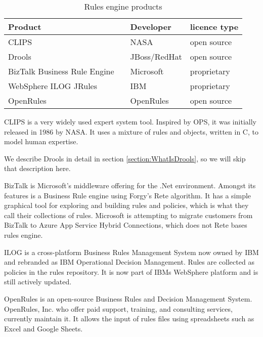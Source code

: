 \begin{table}[h]
    \begin{center}
        \begin{tabular}{ |l c |l|l| } 
            \hline
            Product                      &                             & Developer    & licence type   \\
            \hline
            CLIPS                        &\cite{CLIPSProductPage}      & NASA         & open source    \\ 
            Drools                       &\cite{DroolsProductPage}     & JBoss/RedHat & open source    \\ 
            BizTalk Business Rule Engine &\cite{BiztalkProductPage}    & Microsoft    & proprietary    \\ 
            WebSphere ILOG JRules        &\cite{JRulesProductPage}     & IBM          & proprietary    \\ 
            OpenRules                    &\cite{OpenRulesProductPage}  & OpenRules    & open source    \\ 
            \hline
        \end{tabular}
    \end{center}
    \caption{Rules engine products}
    \label{table:RuleEngines}
\end{table}

CLIPS is a very widely used expert system tool. 
Inspired by OPS, it was initially released in 1986 by NASA. 
It uses a mixture of rules and objects, written in C, to model human expertise.

We describe Drools in detail in section \ref{section:WhatIsDrools}, so we will skip that description here.

BizTalk is Microsoft's middleware offering for the .Net environment. 
Amongst its features is a Business Rule engine using Forgy's Rete algorithm.
It has a simple graphical tool for exploring and building rules and policies, which is what they call their collections of rules.
Microsoft is attempting to migrate customers from BizTalk to Azure App Service Hybrid Connections, which does not Rete bases rules engine.

ILOG is a cross-platform Business Rules Management System now owned by IBM and rebranded as IBM Operational Decision Management.
Rules are collected as policies in the rules repository.
It is now part of IBMs WebSphere platform and is still actively updated.

OpenRules is an open-source Business Rules and Decision Management System. 
OpenRules, Inc. who offer paid support, training, and consulting services, currently maintain it.
It allows the input of rules files using spreadsheets such as Excel and Google Sheets.



